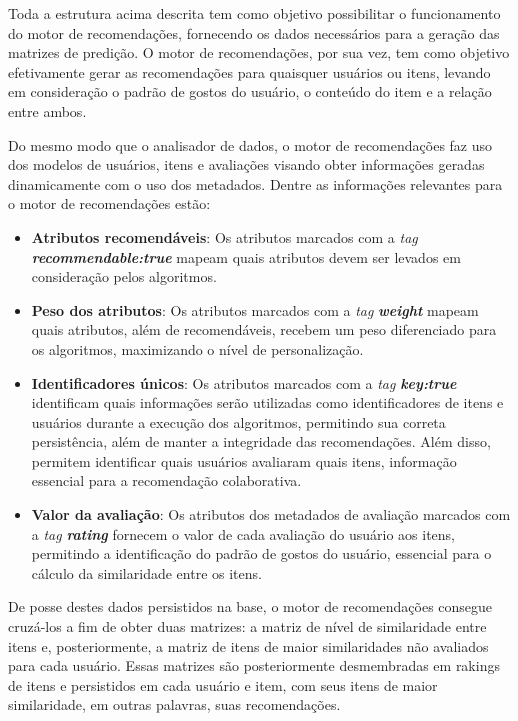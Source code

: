 \documentclass[12pt, openright, oneside, a4paper, brazil]{abntex2}
\begin{document}
Toda a estrutura acima descrita tem como objetivo possibilitar o funcionamento do motor de recomendações, fornecendo os dados necessários para a geração das matrizes de predição. O motor de recomendações, por sua vez, tem como objetivo efetivamente gerar as recomendações para quaisquer usuários ou itens, levando em consideração o padrão de gostos do usuário, o conteúdo do item e a relação entre ambos.

Do mesmo modo que o analisador de dados, o motor de recomendações faz uso dos modelos de usuários, itens e avaliações visando obter informações geradas dinamicamente com o uso dos metadados. Dentre as informações relevantes para o motor de recomendações estão:

\begin{itemize}
	\item \textbf{Atributos recomendáveis}: Os atributos marcados com a \textit{tag} \textbf{\textit{recommendable:true}} mapeam quais atributos devem ser levados em consideração pelos algoritmos.

	\item \textbf{Peso dos atributos}: Os atributos marcados com a \textit{tag} \textbf{\textit{weight}} mapeam quais atributos, além de recomendáveis, recebem um peso diferenciado para os algoritmos, maximizando o nível de personalização.

	\item \textbf{Identificadores únicos}: Os atributos marcados com a \textit{tag} \textbf{\textit{key:true}} identificam quais informações serão utilizadas como identificadores de itens e usuários durante a execução dos algoritmos, permitindo sua correta persistência, além de manter a integridade das recomendações. Além disso, permitem identificar quais usuários avaliaram quais itens, informação essencial para a recomendação colaborativa.

	\item \textbf{Valor da avaliação}: Os atributos dos metadados de avaliação marcados com a \textit{tag} \textbf{\textit{rating}} fornecem o valor de cada avaliação do usuário aos itens, permitindo a identificação do padrão de gostos do usuário, essencial para o cálculo da similaridade entre os itens.
\end{itemize}

De posse destes dados persistidos na base, o motor de recomendações consegue cruzá-los a fim de obter duas matrizes: a matriz de nível de similaridade entre itens e, posteriormente, a matriz de itens de maior similaridades não avaliados para cada usuário. Essas matrizes são posteriormente desmembradas em rakings de itens e persistidos em cada usuário e item, com seus itens de maior similaridade, em outras palavras, suas recomendações.
\end{document}
